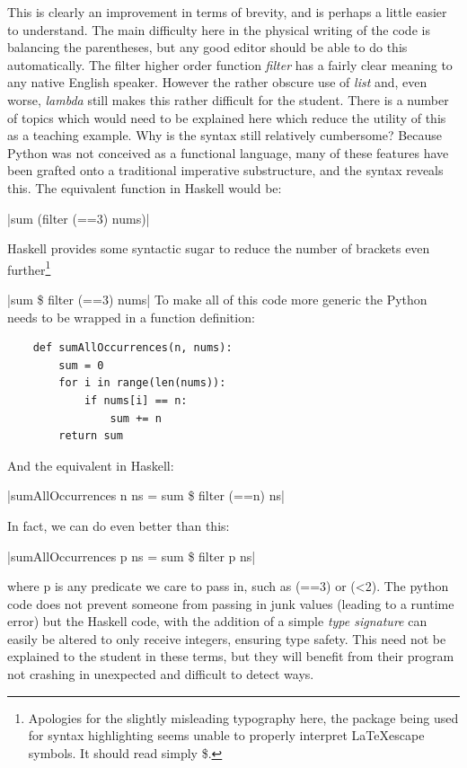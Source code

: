 \documentclass[12pt, a4paper]{report}
\begin{document}
This is clearly an improvement in terms of brevity, and is perhaps a little easier to understand. The
main difficulty here in the physical writing of the code is balancing the parentheses, but any good
editor should be able to do this automatically. The filter
higher order function \textit{filter} has a fairly clear meaning to any native English speaker.
However the rather obscure use of \textit{list} and, even worse, \textit{lambda} still makes
this rather difficult for the student. There is a number of topics which would need to be explained
here which reduce the utility of this as a teaching example. Why is the syntax still relatively
cumbersome? Because Python was not conceived as a functional language, many of these features have
been grafted onto a traditional imperative substructure, and the syntax reveals this.
The equivalent function in Haskell would be:

|sum (filter (==3) nums)|

Haskell provides some syntactic sugar to reduce the number of brackets even 
further\footnote{Apologies for the slightly misleading typography here, the package being used for
syntax highlighting seems unable to properly interpret \LaTeX escape symbols. It should read simply \$.}

|sum \$ filter (==3) nums|    
To make all of this code more generic the Python needs to be wrapped in a function definition:

\begin{verbatim}
    def sumAllOccurrences(n, nums):
        sum = 0
        for i in range(len(nums)):
            if nums[i] == n:
                sum += n
        return sum
\end{verbatim}

And the equivalent in Haskell:

|sumAllOccurrences n ns = sum \$ filter (==n) ns|

In fact, we can do even better than this:

|sumAllOccurrences p ns = sum \$ filter p ns|

where p is any predicate we care to pass in, such as (==3) or (\textless2). The python code does not prevent
someone from passing in junk values (leading to a runtime error) but the Haskell code, with the
addition of a simple \textit{type signature} can easily be altered to only receive integers,
ensuring type safety. This need not be explained to the student in these terms, but they will
benefit from their program not crashing in unexpected and difficult to detect ways.
\end{document}
